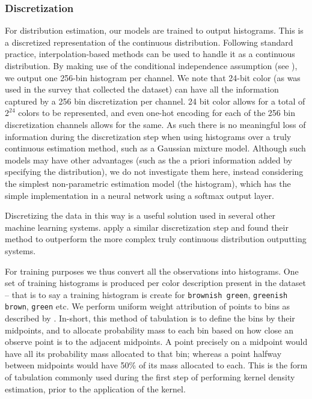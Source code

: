 \documentclass[]{clv3}
\newcommand{\textcite}{\citet}
\newcommand{\natlang}[1]{\texttt{#1}}
\begin{document}
\subsubsection{Discretization} \label{sec:discretization}
For distribution estimation, our models are trained to output histograms.
This is a discretized representation of the continuous distribution.
Following standard practice, interpolation-based methods can be used to handle it as a continuous distribution.
By making use of the conditional independence assumption (see ), we output one 256-bin histogram per channel.
We note that 24-bit color (as was used in the survey that collected the dataset) can have all the information captured by a 256 bin discretization  per channel.
24 bit color allows for a total of $2^{24}$ colors to be represented, and even one-hot encoding for each of the 256 bin discretization channels allows for the same.
As such there is no meaningful loss of information during the discretization step when using histograms over a truly continuous estimation method, such as a Gaussian mixture model.
Although such models may have other advantages (such as the a priori information added by specifying the distribution), we do not investigate them here, instead considering the simplest non-parametric estimation model (the histogram), which has the simple implementation in a neural network using a softmax output layer.

Discretizing the data in this way is a useful solution used in several other machine learning systems.
\textcite{oord2016pixel, DBLP:journals/corr/OordDZSVGKSK16} apply a similar discretization step and found their method to outperform the more complex truly continuous distribution outputting systems.

For training purposes we thus convert all the observations into histograms.
One set of training histograms is produced per color description present in the dataset -- that is to say a training histogram is create for \natlang{brownish green}, \natlang{greenish brown}, \natlang{green} etc.
We perform uniform weight attribution of points to bins as described by \textcite{jones1984remark}.
In-short, this method of tabulation is to define the bins by their midpoints, and to allocate probability mass to each bin based on how close an observe point is to the adjacent midpoints.
A point precisely on a midpoint would have all its probability mass allocated to that bin;
whereas a point halfway between midpoints would have 50\% of its mass allocated to each.
This is the form of tabulation commonly used during the first step of performing kernel density estimation, prior to the application of the kernel.
\end{document}

